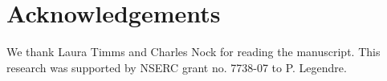 \documentclass[12pt]{ecology}
\begin{document}






\section*{Acknowledgements}

We thank Laura Timms and Charles Nock for reading the manuscript.  This research was supported by NSERC grant no. 7738-07 to P. Legendre.




\makeatletter \renewcommand{\@dotsep}{10000} \makeatother   %
\clearpage    %

\listoffigures
\end{document}
